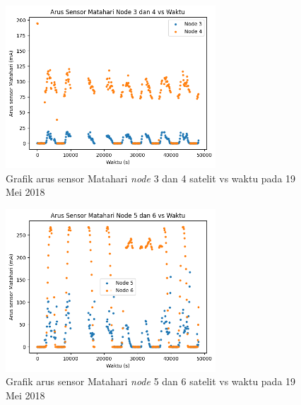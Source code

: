 \begin{figure}[H]
\setlength{}
\begin{center}
\includegraphics[width=0.7\textwidth]{fig/raw_node34_css_2018-05-19.png}
	\caption{Grafik arus sensor Matahari \textit{node} 3 dan 4 satelit vs waktu pada 19 Mei 2018}
\label{fig:rawcss3419}
\end{center}
\end{figure}

\begin{figure}[H]
\setlength{}
\begin{center}
\includegraphics[width=0.7\textwidth]{fig/raw_node56_css_2018-05-19.png}
	\caption{Grafik arus sensor Matahari \textit{node} 5 dan 6 satelit vs waktu pada 19 Mei 2018}
\label{fig:rawcss5619}
\end{center}
\end{figure}

